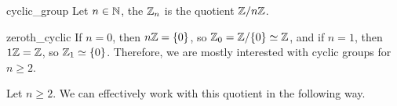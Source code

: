 \begin{cdef}{}{cyclic_group}
    Let \( n \in \mathbb{N} \), the  \( \mathbb{Z}_n \) is the quotient \( \mathbb{Z} / n\mathbb{Z} \).
\end{cdef}

\begin{crem}{}{zeroth_cyclic}
    If \( n = 0 \), then \( n\mathbb{Z} = \{ 0 \} \), so \( \mathbb{Z}_0 = \mathbb{Z} / \{0 \} \simeq \mathbb{Z} \), and if \( n = 1 \), then \( 1\mathbb{Z} = \mathbb{Z} \), so \( \mathbb{Z}_1 \simeq \{ 0 \} \). Therefore, we are mostly interested with cyclic groups for \( n \geq 2 \). 
\end{crem}

Let \( n \geq 2 \). We can effectively work with this quotient in the following way. 
